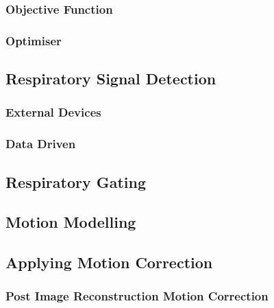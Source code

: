             \subsubsection{Objective Function} \label{image_registration_objective_function}
                \blindtext
                
            \subsubsection{Optimiser} \label{image_registration_optimiser}
                \blindtext
            
        \subsection{Respiratory Signal Detection} \label{respiratory_signal_detection}
            \blindtext
            
            \subsubsection{External Devices} \label{external_devices}
                \blindtext
                
            \subsubsection{Data Driven} \label{data_driven}
                \blindtext
                
        \subsection{Respiratory Gating} \label{respiratory_gating}
            \blindtext
            
        \subsection{Motion Modelling} \label{motion_modelling}
            \blindtext
        
        \subsection{Applying Motion Correction} \label{applying_motion_correction}
            \blindtext
            
            \subsubsection{Post Image Reconstruction Motion Correction} \label{post_image_reconstruction_motion_correction}
                \blindtext
                

